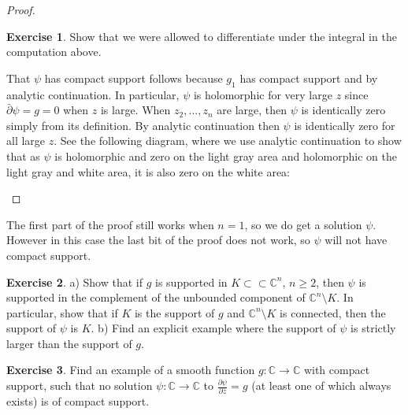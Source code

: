 \documentclass[12pt,openany]{book}
\newcommand{\C}{{\mathbb{C}}}
\theoremstyle{plain}
\theoremstyle{remark}
\theoremstyle{definition}
\newenvironment{exbox}{%
    \def\FrameCommand{\vrule width 1pt \relax\hspace {10pt}}%
    \MakeFramed {\advance \hsize -\width \FrameRestore }%
}{%
    \endMakeFramed
}
\theoremstyle{exercise}
\newtheorem{exercise}{Exercise}[section]
\theoremstyle{example}
\begin{document}
\begin{proof}
\begin{exbox}
\begin{exercise}
Show that we were allowed to differentiate under the integral in the
computation above.
\end{exercise}
\end{exbox}

That $\psi$ has compact support follows because $g_1$ has compact
support and by analytic continuation.  In particular, $\psi$ is
holomorphic for very large $z$ since $\bar{\partial} \psi = g = 0$ when $z$
is large.  When $z_2,\ldots,z_n$ are large, then $\psi$ is identically zero
simply from its definition.  By analytic continuation then $\psi$ is
identically zero for all large $z$.  See the following diagram, where we use
analytic continuation to show that as $\psi$ is holomorphic and zero on the
light gray area and holomorphic on the light gray and white area, it is also
zero on the white area:

\begin{center}

\end{center}
\end{proof}

The first part of the proof still works when $n=1$, so we do get a solution
$\psi$.  However in this case the last bit of the proof does not work, so
$\psi$ will not have compact support.

\begin{exbox}
\begin{exercise} \label{exercise:supportofpsi}
a) Show that if $g$ is supported in $K \subset \subset \C^n$, $n \geq 2$,
then $\psi$ is supported in the complement of the unbounded component
of $\C^n \setminus K$.  In particular, show that if $K$ is the support of
$g$ and $\C^n \setminus K$ is connected, then the support of
$\psi$ is $K$.
b) Find an explicit example where the support of $\psi$ is strictly larger
than the support of $g$.
\end{exercise}

\begin{exercise}
Find an example of a smooth function $g \colon \C \to \C$ with compact
support, such that no solution $\psi \colon \C \to \C$ to
$\frac{\partial \psi}{\partial \bar{z}} = g$ (at least one of which always exists) is
of compact support.
\end{exercise}
\end{exbox}

\end{document}
